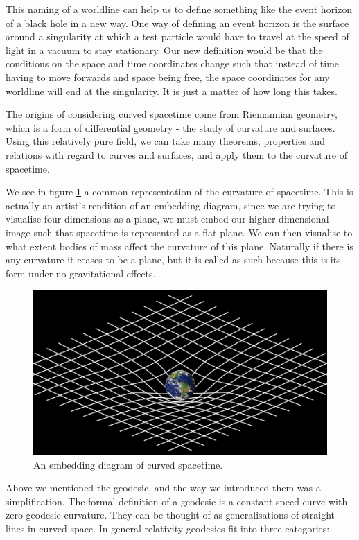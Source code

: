\documentclass[oneside,openright,frontopenright, singlespacing]{dmathesis}
\begin{document}
\vspace{1em}
	This naming of a worldline can help us to define something like the event horizon of a black hole in a new way. One way of defining an event horizon is the surface around a singularity at which a test particle would have to travel at the speed of light in a vacuum to stay stationary. Our new definition would be that the conditions on the space and time coordinates change such that instead of time having to move forwards and space being free, the space coordinates for any worldline will end at the singularity. It is just a matter of how long this takes.

\vspace{1em}
	The origins of considering curved spacetime come from Riemannian geometry, which is a form of differential geometry - the study of curvature and surfaces. Using this relatively pure field, we can take many theorems, properties and relations with regard to curves and surfaces, and apply them to the curvature of spacetime.

\vspace{1em}
		We see in figure \ref{fig:Figure2.1} a common representation of the curvature of spacetime. This is actually an artist's rendition of an embedding diagram, since we are trying to visualise four dimensions as a plane, we must embed our higher dimensional image such that spacetime is represented as a flat plane. We can then visualise to what extent bodies of mass affect the curvature of this plane. Naturally if there is any curvature it ceases to be a plane, but it is called as such because this is its form under no gravitational effects.

\begin{figure}[!ht]
	\centering
	\includegraphics[width=0.5\linewidth]{img/curved-spacetime}
	\caption{An embedding diagram of curved spacetime.}
	\label{fig:Figure2.1}
\end{figure}

	Above we mentioned the geodesic, and the way we introduced them was a simplification. The formal definition of a geodesic is a constant speed curve with zero geodesic curvature. They can be thought of as generalisations of straight lines in curved space. In general relativity geodesics fit into three categories:
\end{document}
